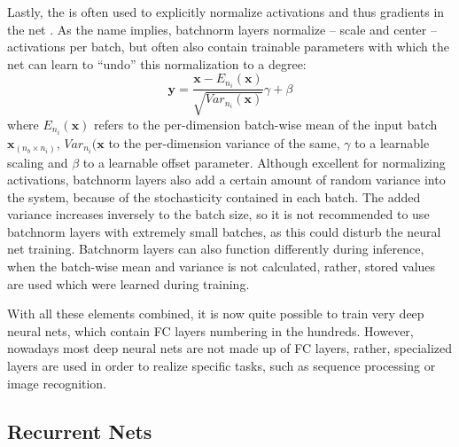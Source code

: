 			Lastly, the  is often used to explicitly normalize activations and thus gradients in the net \cite{batchnorm}.
			As the name implies, batchnorm layers normalize -- scale and center -- activations per batch, but often also contain trainable parameters with which the net can learn to ``undo'' this normalization to a degree:
			\begin{equation}
				\mathbf{y} = \frac{\mathbf{x} - E_{n_i}(\mathbf{x})}{\sqrt{Var_{n_i}(\mathbf{x})}}\gamma + \beta
			\end{equation}
			\noindent where $E_{n_i}(\mathbf{x})$ refers to the per-dimension batch-wise mean of the input batch $\mathbf{x}_{(n_b \times n_i)}$, $Var_{n_i}(\mathbf{x}$ to the per-dimension variance of the same, $\gamma$ to a learnable scaling and $\beta$ to a learnable offset parameter.		
			Although excellent for normalizing activations, batchnorm layers also add a certain amount of random variance into the system, because of the stochasticity contained in each batch.
			The added variance increases inversely to the batch size, so it is not recommended to use batchnorm layers with extremely small batches, as this could disturb the neural net training.
			Batchnorm layers can also function differently during inference, when the batch-wise mean and variance is not calculated, rather, stored values are used which were learned during training.
			
			With all these elements combined, it is now quite possible to train very deep neural nets, which contain \ac{FC} layers numbering in the hundreds.
			However, nowadays most deep neural nets are not made up of \ac{FC} layers, rather, specialized layers are used in order to realize specific tasks, such as sequence processing or image recognition.
			
		\subsection{Recurrent Nets}
			\label{cha:deep_learning:sec:recurrent_nets}
		
